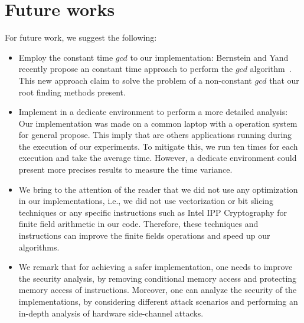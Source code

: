 \section{Future works}
For future work, we suggest the following:

\begin{itemize}
    \item Employ the constant time $gcd$ to our implementation: Bernstein and Yand recently propose an constant time approach to perform the $gcd$ algorithm~\cite{Bernstein_Yang_2019}. This new approach claim to solve the problem of a non-constant $gcd$ that our root finding methods present. 
    \item Implement in a dedicate environment to perform a more detailed analysis: Our implementation was made on a common laptop with a operation system for general propose. This imply that are others applications running during the execution of our experiments. To mitigate this, we run ten times for each execution and take the average time. However, a dedicate environment could present more precises results to measure the time variance. 
    \item We bring to the attention of the reader that we did not use any optimization in our implementations, i.e., we did not use vectorization or bit slicing techniques or any specific instructions such as Intel\textsuperscript{\tiny\textregistered} IPP Cryptography for finite field arithmetic in our code. Therefore, these techniques and instructions can improve the finite fields operations and speed up our algorithms.
    \item We remark that for achieving a safer implementation, one needs to improve the security analysis, by removing conditional memory access and protecting memory access of instructions. Moreover, one can analyze the security of the implementations, by considering different attack scenarios and performing an in-depth analysis of hardware side-channel attacks. 
\end{itemize}